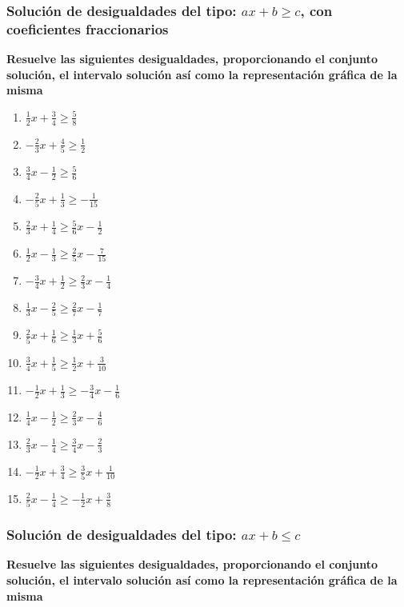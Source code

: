 \documentclass[12pt]{article}
\begin{document}
\subsubsection{Solución de desigualdades del tipo: \(ax+b \geq c\), con coeficientes fraccionarios}{
\textbf{Resuelve las siguientes desigualdades, proporcionando el conjunto solución, el intervalo solución así como la representación gráfica de la misma}

\begin{enumerate}
\def\labelenumi{\arabic{enumi}.}
\item
  \(\frac{1}{2}x + \frac{3}{4} \geq \frac{5}{8}\)
\item
  \(-\frac{2}{3}x + \frac{4}{5} \geq \frac{1}{2}\)
\item
  \(\frac{3}{4}x - \frac{1}{2} \geq \frac{5}{6}\)
\item
  \(-\frac{2}{5}x + \frac{1}{3} \geq -\frac{1}{15}\)
\item
  \(\frac{2}{3}x + \frac{1}{4} \geq \frac{5}{6}x - \frac{1}{2}\)
\item
  \(\frac{1}{2}x - \frac{1}{3} \geq \frac{2}{5}x - \frac{7}{15}\)
\item
  \(-\frac{3}{4}x + \frac{1}{2} \geq \frac{2}{3}x - \frac{1}{4}\)
\item
  \(\frac{1}{3}x - \frac{2}{5} \geq \frac{2}{7}x - \frac{1}{7}\)
\item
  \(\frac{2}{5}x + \frac{1}{6} \geq \frac{1}{3}x + \frac{5}{6}\)
\item
  \(\frac{3}{4}x + \frac{1}{5} \geq \frac{1}{2}x + \frac{3}{10}\)
\item
  \(-\frac{1}{2}x + \frac{1}{3} \geq -\frac{3}{4}x - \frac{1}{6}\)
\item
  \(\frac{1}{4}x - \frac{1}{2} \geq \frac{2}{3}x - \frac{4}{6}\)
\item
  \(\frac{2}{3}x - \frac{1}{4} \geq \frac{3}{4}x - \frac{2}{3}\)
\item
  \(-\frac{1}{2}x + \frac{3}{4} \geq \frac{3}{5}x + \frac{1}{10}\)
\item
  \(\frac{2}{5}x - \frac{1}{4} \geq -\frac{1}{2}x + \frac{3}{8}\)
\end{enumerate}

\subsubsection{Solución de desigualdades del tipo: \(ax+b \leq c\)}

\textbf{Resuelve las siguientes desigualdades, proporcionando el conjunto solución, el intervalo solución así como la representación gráfica de la misma}

}
\end{document}
